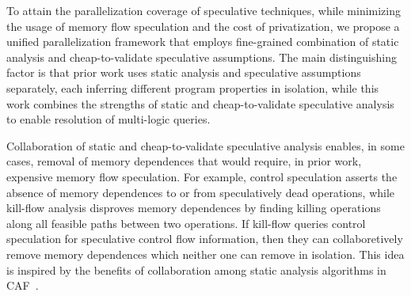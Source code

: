 %

To attain the parallelization coverage of speculative techniques, while
minimizing the usage of memory flow speculation and the cost of privatization,
we propose a unified parallelization framework that employs fine-grained
combination of static analysis and cheap-to-validate speculative assumptions.
%
The main distinguishing factor is that prior work uses static analysis and
speculative assumptions separately, each inferring different program properties
in isolation, while this work combines the strengths of static and
cheap-to-validate speculative analysis to enable resolution of multi-logic
queries.
%
%
%

Collaboration of static and cheap-to-validate speculative analysis enables, in
some cases, removal of memory dependences that would require, in prior work,
expensive memory flow speculation.
%
For example, control speculation asserts the absence of memory dependences to or
from speculatively dead operations, while kill-flow analysis disproves memory
dependences by finding killing operations along all feasible paths between two
operations. If kill-flow queries control speculation for speculative control
flow information, then they can collaboretively remove memory dependences which
neither one can remove in isolation.
%
This idea is inspired by the benefits of collaboration among static analysis
algorithms in CAF~\cite{johnson:17:cgo}.

